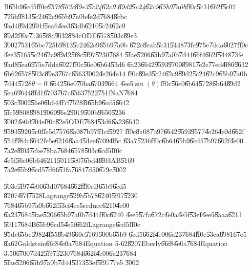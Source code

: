 B\U{65b9}\U{6cd5}\U{ff0c}\emph{\U{6578}\U{503c}\U{89e3}\U{5c24}\U{62c9}%
\U{89d2}\U{5c24}\U{62c9}\U{65b9}\U{7a0b}}\U{ff0c}\U{5c31}\U{662f}\U{5c07}%
\U{725b}\U{9813}\U{5c24}\U{62c9}\U{65b9}\U{7a0b}\U{4e2d}\U{7684}\U{8cbc}%
\U{9ad4}\U{89d2}\U{901f}\U{5ea6}\U{4ee3}\U{63db}\U{6210}\U{5c24}\U{62c9}%
\U{89d2}\U{ff0c}\U{7136}\U{5f8c}\U{9032}\U{884c}ODE\U{6578}\U{503c}\U{89e3}%
\U{3002}\U{7531}\U{65bc}\U{725b}\U{9813}\U{5c24}\U{62c9}\U{65b9}\U{7a0b}%
\U{672c}\U{8eab}\U{5c31}\U{5448}\U{73fe}\U{975e}\U{7dda}\U{6027}\U{ff0c}%
\U{4ee3}\U{5165}\U{5c24}\U{62c9}\U{89d2}\U{5f8c}\U{5f97}\U{5230}\U{7684}%
\U{5fae}\U{5206}\U{65b9}\U{7a0b}\U{7d44}\U{66f4}\U{662f}\U{5448}\U{73fe}%
\U{9ad8}\U{5ea6}\U{975e}\U{7dda}\U{6027}\U{ff0c}\U{56e0}\U{6b64}\U{53d6}%
\U{6a23}\U{6642}\U{9593}\U{9700}\U{8981}\U{7e2e}\U{77ed}\U{4f86}\U{9632}%
\U{6b62}\U{6578}\U{503c}\U{89e3}\U{767c}\U{6563}\U{3002}\U{4e26}\U{4e14}%
\U{ff0c}\U{89e3}\U{5c24}\U{62c9}\U{89d2}\U{5c24}\U{62c9}\U{65b9}\U{7a0b}%
\U{7d44}\U{5728}$\theta =0^{\circ }$\U{6642}\U{56e0}\U{70ba}\U{6703}\U{9664}%
\U{4ee5}$\sin (\theta )$\U{ff0c}\U{56e0}\U{6b64}\U{5728}\U{6b64}\U{89d2}%
\U{5ea6}\U{9644}\U{8fd1}\U{6703}\U{767c}\U{6563}\U{7522}\U{751f}NaN\U{7684}%
\U{503c}\U{3002}\U{56e0}\U{6b64}\U{4f7f}\U{7528}B\U{65b9}\U{6cd5}\U{6642}%
\U{5fc5}\U{9808}\U{8981}\U{9060}\U{96e2}\U{9019}\U{500b}\U{9650}\U{5236}%
\U{3002}\U{4e0d}\U{904e}\U{ff0c}\U{82e5}ODE\U{7684}\U{53d6}\U{6a23}\U{6642}%
\U{9593}\U{5920}\U{5c0f}\U{fe5d}\U{7576}\U{8a08}\U{7b97}\U{91cf}\U{5927}%
\U{ff0c}\U{8a08}\U{7b97}\U{6642}\U{9593}\U{9577}\U{4e26}\U{4e0d}\U{662f}%
\U{554f}\U{984c}\U{6642}\U{fe5e}\U{6216}\U{8aa4}\U{5dee}\U{6709}\U{4f5c}%
\U{63a7}\U{5236}\U{ff0c}\U{6b64}\U{65b9}\U{6cd5}\U{7b97}\U{662f}\U{4e00}%
\U{7a2e}\U{8f03}\U{7cbe}\U{78ba}\U{7684}\U{6578}\U{503c}\U{6cd5}\U{ff0c}%
\U{4e5f}\U{56e0}\U{6b64}\U{6211}\U{5011}\U{5c07}\U{6bd4}\U{8f03}AB\U{5169}%
\U{7a2e}\U{65b9}\U{6cd5}\U{7d66}\U{51fa}\U{7684}\U{7d50}\U{679c}\U{3002}

\U{503c}\U{5f97}\U{4e00}\U{63d0}\U{7684}\U{662f}\U{ff0c}B\U{65b9}\U{6cd5}%
\U{8207}\U{4f7f}\U{7528}Lagrange\U{529b}\U{5b78}\U{6240}\U{5f97}\U{5230}%
\U{7684}\U{65b9}\U{7a0b}\U{662f}\U{53ef}\U{4ee5}reduce\U{6210}\U{4e00}%
\U{6a23}\U{7684}\U{5fae}\U{5206}\U{65b9}\U{7a0b}\U{7d44}\U{ff0c}\U{6240}%
\U{4ee5}\U{57fa}\U{672c}\U{4e0a}\U{4e5f}\U{53ef}\U{4ee5}\U{8aaa}\U{6211}%
\U{5011}\U{7684}B\U{65b9}\U{6cd5}\U{4e5f}\U{662f}Lagrange\U{6cd5}\U{ff0c}%
\U{95dc}\U{65bc}\U{5982}\U{4f55}\U{8b49}\U{660e}\U{5169}\U{500b}\U{65b9}%
\U{6cd5}\U{662f}\U{4e00}\U{6a23}\U{7684}\U{ff0c}\U{53ea}\U{8981}\U{67e5}%
\U{8a62}Goldstein\U{66f8}\U{4e0a}\cite[Page 216]{goldstein}\U{7684}Equation
5-62\U{8207}Eberly\U{66f8}\U{4e0a}\cite[Page 158]{eberly}\U{7684}Equation
3.50\U{6700}\U{7d42}\U{5f97}\U{5230}\U{7684}\U{662f}\U{4e00}\U{6a23}\U{7684}%
\U{5fae}\U{5206}\U{65b9}\U{7a0b}\U{7d44}\U{5373}\U{53ef}\U{5f97}\U{77e5}%
\U{3002}

